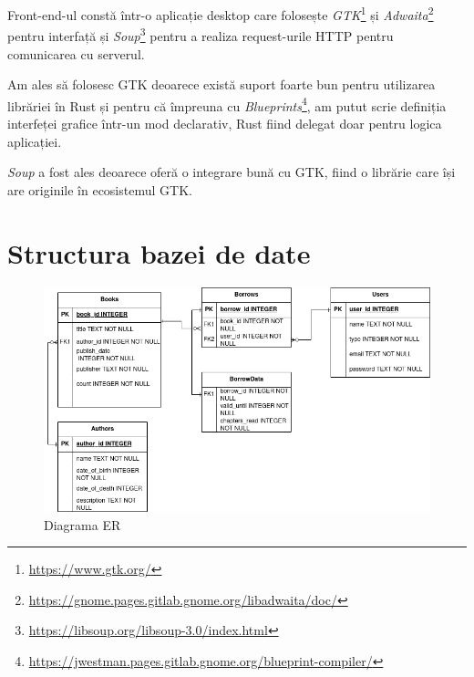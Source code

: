 \documentclass{article}
\begin{document}
    Front-end-ul constă într-o aplicație desktop care folosește \emph{GTK}\footnote{\url{https://www.gtk.org/}}
    și \emph{Adwaita}\footnote{\url{https://gnome.pages.gitlab.gnome.org/libadwaita/doc/}} pentru interfață și
    \emph{Soup}\footnote{\url{https://libsoup.org/libsoup-3.0/index.html}} pentru a realiza request-urile HTTP
    pentru comunicarea cu serverul.

    Am ales să folosesc GTK deoarece există suport foarte bun pentru utilizarea librăriei în Rust și pentru
    că împreuna cu \emph{Blueprints}\footnote{\url{https://jwestman.pages.gitlab.gnome.org/blueprint-compiler/}},
    am putut scrie definiția interfeței grafice într-un mod declarativ, Rust fiind delegat doar pentru logica
    aplicației.

    \emph{Soup} a fost ales deoarece oferă o integrare bună cu GTK, fiind o librărie care își are originile
    în ecosistemul GTK.

    \section{Structura bazei de date}

    \begin{figure}[H]
        \includegraphics[width=\linewidth]{ER-Diagram}
        \centering
        \caption{Diagrama ER}
    \end{figure}
\end{document}
